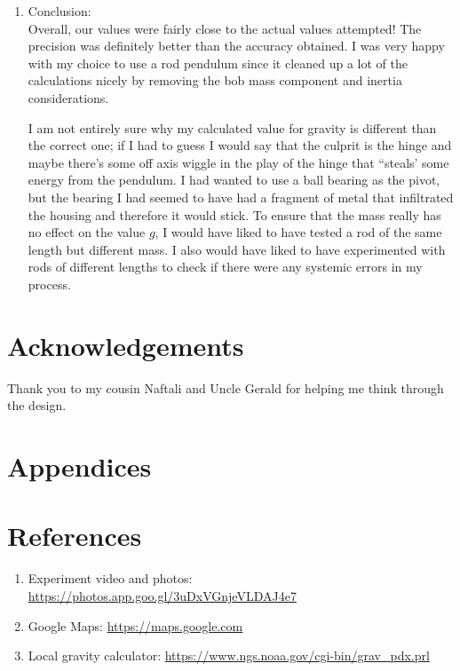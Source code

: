 \documentclass[12pt]{article}
\begin{document}
\begin{enumerate}[label=(\alph*)]
        \item Conclusion:\\
            Overall, our values were fairly close to the actual values attempted! The precision was definitely better than the accuracy obtained. I was very happy with my choice to use a rod pendulum since it cleaned up a lot of the calculations nicely by removing the bob mass component and inertia considerations.

            I am not entirely sure why my calculated value for gravity is different than the correct one; if I had to guess I would say that the culprit is the hinge and maybe there's some off axis wiggle in the play of the hinge that ``steals' some energy from the pendulum. I had wanted to use a ball bearing as the pivot, but the bearing I had seemed to have had a fragment of metal that infiltrated the housing and therefore it would stick. To ensure that the mass really has no effect on the value $g$, I would have liked to have tested a rod of the same length but different mass. I also would have liked to have experimented with rods of different lengths to check if there were any systemic errors in my process.
    \end{enumerate}
\section{Acknowledgements}
    Thank you to my cousin Naftali and Uncle Gerald for helping me think through the design.
\section{Appendices}
\section{References}
    \begin{enumerate}
        \item Experiment video and photos: \url{https://photos.app.goo.gl/3uDxVGnjeVLDAJ4e7} 
        \item Google Maps: \url{https://maps.google.com}
        \item Local gravity calculator: \url{https://www.ngs.noaa.gov/cgi-bin/grav_pdx.prl}
    \end{enumerate}
\end{document}
